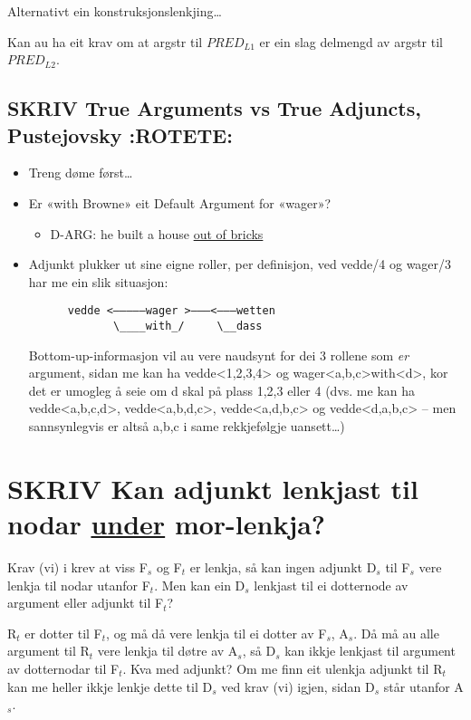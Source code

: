 \documentclass[11pt,a4paper,oneside,draft]{book}
\begin{document}
Alternativt ein konstruksjonslenkjing\ldots{} 

Kan au ha eit krav om at argstr til $PRED_{L1}$ er ein slag delmengd av
argstr til $PRED_{L2}$. 
\subsection{\textbf{SKRIV} True Arguments vs True Adjuncts, Pustejovsky \textbf{:ROTETE:}}
\label{sec-3.12.7}

\begin{itemize}
\item Treng døme først\ldots{}
\item Er «with Browne» eit Default Argument for «wager»?

\begin{itemize}
\item D-ARG: he built a house \underline{out of bricks}
\end{itemize}

\item Adjunkt plukker ut sine eigne roller, per definisjon, ved
     vedde/4 og wager/3 har me ein slik situasjon:
\begin{verbatim}
      vedde <—————wager >———<———wetten
             \____with_/     \__dass
\end{verbatim}

     Bottom-up-informasjon vil au vere naudsynt for dei 3 rollene
     som \emph{er} argument, sidan me kan ha vedde<1,2,3,4> og
     wager<a,b,c>with<d>, kor det er umogleg å seie om d skal på plass
     1,2,3 eller 4 (dvs. me kan ha vedde<a,b,c,d>, vedde<a,b,d,c>,
     vedde<a,d,b,c> og vedde<d,a,b,c> -- men sannsynlegvis er altså
     a,b,c i same rekkjefølgje uansett\ldots{})
\end{itemize}
\section{\textbf{SKRIV} Kan adjunkt lenkjast til nodar \underline{under} mor-lenkja?}
\label{sec-3.13}

\label{SEC:merge-daughters}

Krav (vi) i \citet[s.~75]{dyvik2009lmp} krev at viss F$_s$ og F$_t$ er
lenkja, så kan ingen adjunkt D$_s$ til F$_s$ vere lenkja til nodar utanfor
F$_t$. Men kan ein D$_s$ lenkjast til ei dotternode av argument eller
adjunkt til F$_t$?

R$_t$ er dotter til F$_t$, og må då vere lenkja til ei dotter av F$_s$,
A$_s$. Då må au alle argument til R$_t$ vere lenkja til døtre av A$_s$, så
D$_s$ kan ikkje lenkjast til argument av dotternodar til F$_t$. Kva med
adjunkt? Om me finn eit ulenkja adjunkt til R$_t$ kan me heller ikkje
lenkje dette til D$_s$ ved krav (vi) igjen, sidan D$_s$ står utanfor
A$_s$.
\end{document}
